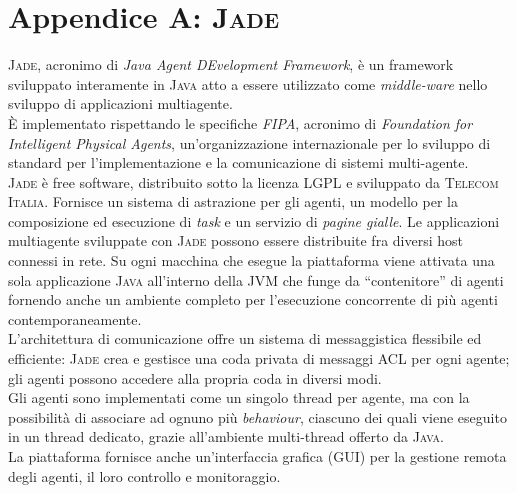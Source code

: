 \chapter*{Appendice A: \textsc{Jade}}

\graphicspath{{Appendix1/figures/}}

\textsc{Jade}, acronimo di \emph{Java Agent DEvelopment Framework}, è un framework sviluppato interamente in \textsc{Java} atto a essere utilizzato come \emph{middle-ware} nello sviluppo di applicazioni multiagente.\\
È implementato rispettando le specifiche \emph{FIPA}, acronimo di \emph{Foundation for Intelligent Physical Agents}, un'organizzazione internazionale per lo sviluppo di standard per l'implementazione e la comunicazione di sistemi multi-agente.\\
\textsc{Jade} è free software, distribuito sotto la licenza LGPL e sviluppato da \textsc{Telecom Italia}.
Fornisce un sistema di astrazione per gli agenti,  un modello per la composizione ed esecuzione di \emph{task} e un servizio di \emph{pagine gialle}.
Le applicazioni multiagente sviluppate con \textsc{Jade} possono essere distribuite fra diversi host connessi in rete.
Su ogni macchina che esegue la piattaforma viene attivata una sola applicazione \textsc{Java} all'interno della JVM che funge da ``contenitore'' di agenti fornendo anche un ambiente completo per l'esecuzione concorrente di più agenti contemporaneamente.
\\L'architettura di comunicazione offre un sistema di messaggistica flessibile ed efficiente: \textsc{Jade} crea e gestisce una coda privata di messaggi ACL per ogni agente; gli agenti possono accedere alla propria coda in diversi modi.\\
Gli agenti sono implementati come un singolo thread per agente, ma con la possibilità di associare ad ognuno più \emph{behaviour}, ciascuno dei quali viene eseguito in un thread dedicato, grazie all'ambiente multi-thread offerto da \textsc{Java}.\\
La piattaforma fornisce anche un'interfaccia grafica (GUI) per la gestione remota degli agenti, il loro controllo e monitoraggio.
